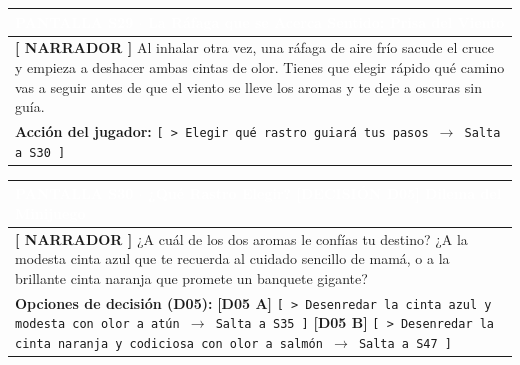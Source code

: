 \documentclass[11pt, a4paper]{article}
\begin{document}
\vspace{1em}

\noindent
\begin{tabularx}{\textwidth}{|X|}
\hline
\rowcolor{colorHeader}
\textbf{\textcolor{white}{PANTALLA S29 $\cdot$ La Ráfaga que se Acerca}} \hfill \small\textcolor{white}{Sentido: Prisa del Viento} \\ \hline
\rowcolor{colorTextoBox}
\textbf{\textcolor{colorEmisor}{[ NARRADOR ]}} \vspace{0.2em}\newline
Al inhalar otra vez, una ráfaga de aire frío sacude el cruce y empieza a deshacer ambas cintas de olor. Tienes que elegir rápido qué camino vas a seguir antes de que el viento se lleve los aromas y te deje a oscuras sin guía. \\ \hline
\rowcolor{colorBotonBox}
\textbf{Acción del jugador:} \newline
\texttt{[ > Elegir qué rastro guiará tus pasos $\rightarrow$ Salta a S30 ]} \\ \hline
\end{tabularx}

\vspace{1em}

\noindent
\begin{tabularx}{\textwidth}{|X|}
\hline
\rowcolor{colorDecision}
\textbf{\textcolor{white}{PANTALLA S30 $\cdot$ ¿Qué Rastro Elegir? [DECISIÓN D05]}} \hfill \small\textcolor{white}{Dilema del Minijuego} \\ \hline
\rowcolor{colorTextoBox}
\textbf{\textcolor{colorEmisor}{[ NARRADOR ]}} \vspace{0.2em}\newline
¿A cuál de los dos aromas le confías tu destino? ¿A la modesta cinta azul que te recuerda al cuidado sencillo de mamá, o a la brillante cinta naranja que promete un banquete gigante? \\ \hline
\rowcolor{colorBotonBox}
\textbf{Opciones de decisión (D05):} \newline
\textbf{[D05 A]} {\small\texttt{[ > Desenredar la cinta azul y modesta con olor a atún $\rightarrow$ Salta a S35 ]}} \vspace{0.3em}\newline
\textbf{[D05 B]} {\small\texttt{[ > Desenredar la cinta naranja y codiciosa con olor a salmón $\rightarrow$ Salta a S47 ]}} \\ \hline
\end{tabularx}

\newpage
\end{document}
